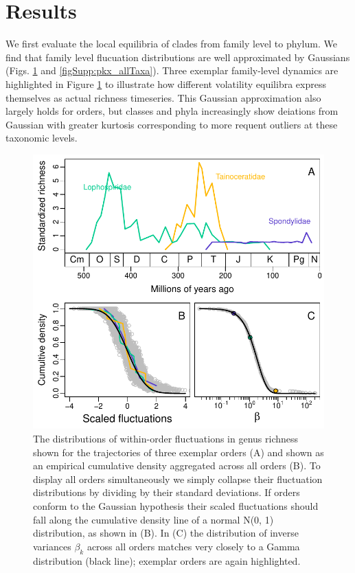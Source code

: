 \documentclass[12pt]{article}
\begin{document}
\section{Results}

We first evaluate the local equilibria of clades from family level to
phylum. We find that family level flucuation distributions are well
approximated by Gaussians (Figs. \ref{fig:pk_f} and
\ref{figSupp:pkx_allTaxa}).  Three exemplar family-level dynamics are
highlighted in Figure \ref{fig:pk_f} to illustrate how different
volatility equilibra express themselves as actual richness timeseries.
This Gaussian approximation also largely holds for orders, but classes
and phyla increasingly show deiations from Gaussian with greater
kurtosis corresponding to more requent outliers at these taxonomic
levels.


\begin{figure}[!h]
  \centering
  \includegraphics[scale=0.8]{../../fig_pkx-fbeta.pdf}
  \caption[Variability in trajectories of within-order fluctuations in
  genus richness]{The distributions of within-order fluctuations in
    genus richness shown for the trajectories of three exemplar
    orders (A) and shown as an empirical cumulative density aggregated
    across all orders (B). To display all orders simultaneously we
    simply collapse their fluctuation distributions by dividing by
    their standard deviations. If orders conform to the Gaussian
    hypothesis their scaled fluctuations should fall along the
    cumulative density line of a normal N(0, 1) distribution, as shown
    in (B). In (C) the distribution of inverse variances $\beta_k$
    across all orders matches very closely to a Gamma distribution
    (black line); exemplar orders are again highlighted.}
  \label{fig:pk_f}
\end{figure}
\end{document}
